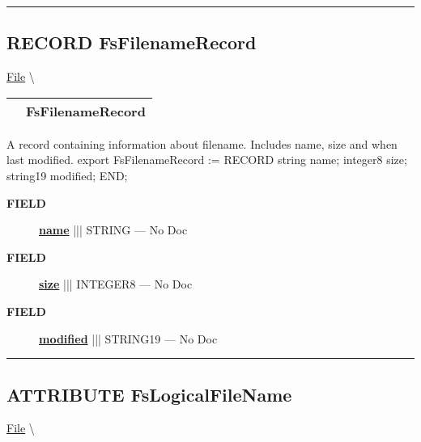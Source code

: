 \rule{\linewidth}{0.5pt}

\subsection*{\textsf{\colorbox{headtoc}{\color{white} RECORD}
FsFilenameRecord}}

\hypertarget{ecldoc:file.fsfilenamerecord}{}
\hspace{0pt} \hyperlink{ecldoc:File}{File} \textbackslash 

{\renewcommand{\arraystretch}{1.5}
\begin{tabularx}{\textwidth}{|>{\raggedright\arraybackslash}l|X|}
\hline
\hspace{0pt}\mytexttt{\color{red} } & \textbf{FsFilenameRecord} \\
\hline
\end{tabularx}
}

\par





A record containing information about filename. Includes name, size and when last modified. export FsFilenameRecord := RECORD string name; integer8 size; string19 modified; END;







\par
\begin{description}
\item [\colorbox{tagtype}{\color{white} \textbf{\textsf{FIELD}}}] \textbf{\underline{name}} ||| STRING --- No Doc
\item [\colorbox{tagtype}{\color{white} \textbf{\textsf{FIELD}}}] \textbf{\underline{size}} ||| INTEGER8 --- No Doc
\item [\colorbox{tagtype}{\color{white} \textbf{\textsf{FIELD}}}] \textbf{\underline{modified}} ||| STRING19 --- No Doc
\end{description}





\rule{\linewidth}{0.5pt}
\subsection*{\textsf{\colorbox{headtoc}{\color{white} ATTRIBUTE}
FsLogicalFileName}}

\hypertarget{ecldoc:file.fslogicalfilename}{}
\hspace{0pt} \hyperlink{ecldoc:File}{File} \textbackslash 

